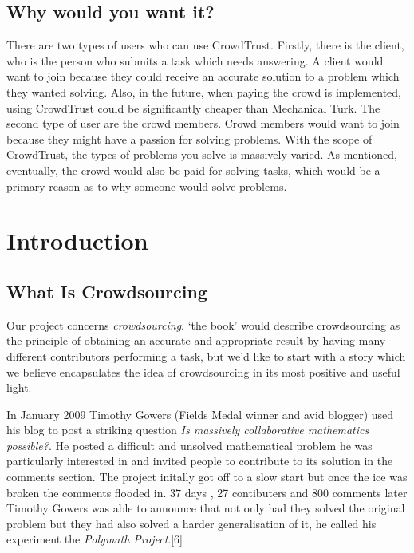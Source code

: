 \documentclass[11pt]{article}
\begin{document}
\subsection{Why would you want it?}
There are two types of users who can use CrowdTrust. Firstly, there is the client,
who is the person who submits a task which needs answering. A client would want
to join because they could receive an accurate solution to a problem which they
wanted solving. Also, in the future, when paying the crowd is implemented,
using CrowdTrust could be significantly cheaper than Mechanical Turk. The second
type of user are the crowd members. Crowd members would want to join because
they might have a passion for solving problems. With the scope of CrowdTrust,
the types of problems you solve is massively varied. As mentioned, eventually, the crowd
would also be paid for solving tasks, which would be a primary reason as to why
someone would solve problems.
\newpage
\section{Introduction}
\subsection{What Is Crowdsourcing} %
Our project concerns \emph{crowdsourcing}. `the book' would describe crowdsourcing as the principle of obtaining an accurate 
and appropriate result by having many different contributors performing a task, but we'd like to start with a story which
we believe encapsulates the idea of crowdsourcing in its most positive and useful light.

In January 2009 Timothy Gowers (Fields Medal winner and avid blogger) used his blog to post a striking question \emph{Is massively 
collaborative mathematics possible?}. He posted a difficult and unsolved mathematical problem he was particularly interested in and invited 
people to contribute to its solution in the comments section. The project initally got off to a slow start but once the ice was broken the 
comments flooded in. 37 days , 27 contibuters and 800 comments later Timothy Gowers was able to announce that not only had they solved the 
original problem but they had also solved a harder generalisation of it, he called his experiment the \emph{Polymath Project}.[6]
\end{document}
